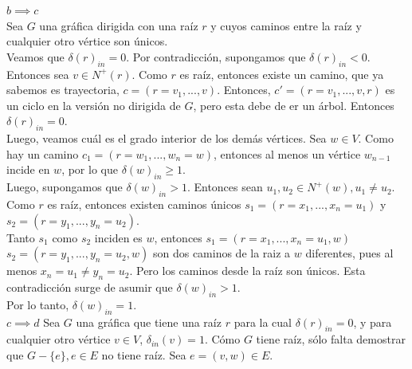 \documentclass[12pt,a4paper]{report}
\begin{document}
\begin{enumerate}
{			$b \implies c$\\
			Sea $G$ una gráfica dirigida con una raíz $r$ y cuyos caminos entre la raíz y
			cualquier otro vértice son únicos.\\
			Veamos que $\delta(r)_{in} = 0$. Por contradicción, supongamos que
			$\delta(r)_{in} < 0$. Entonces sea $v \in N^+(r)$. Como $r$ es raíz,
			entonces existe un camino, que ya sabemos es trayectoria,
			$c = (r = v_1, ..., v)$. Entonces, $c' = (r = v_1, ..., v, r)$ es un
			ciclo en la versión no dirigida de $G$, pero esta debe de er un árbol.
			Entonces $\delta(r)_{in} = 0$.\\
			Luego, veamos cuál es el grado interior de los demás vértices.
			Sea $w \in V$. Como hay un camino $c_1 = (r = w_1, ..., w_n = w)$,
			entonces al menos un vértice $w_{n-1}$ incide en $w$, por lo que
			$\delta(w)_{in} \geq 1$.\\
			Luego, supongamos que $\delta(w)_{in} > 1$. Entonces sean
			 $u_1, u_2 \in N^+(w), u_1 \neq u_2$.\\
			Como $r$ es raíz, entonces existen caminos únicos $s_1 = (r = x_1, ..., x_n = u_1)$
			y $s_2 = (r = y_1, ..., y_n = u_2)$.\\
			Tanto $s_1$ como  $s_2$ inciden es $w$, entonces
			$s_1 = (r = x_1, ..., x_n = u_1, w)$ $s_2 = (r = y_1, ..., y_n = u_2, w)$
			son dos caminos de la raiz a $w$ diferentes, pues al menos $x_n = u_1 \neq y_n = u_2$.
			Pero los caminos desde la raíz son únicos. Esta contradicción surge de
			asumir que $\delta(w)_{in} > 1$.\\
			Por lo tanto, $\delta(w)_{in} = 1$.\\

			$c \implies d$
			Sea $G$ una gráfica que tiene una raíz $r$ para la cual $\delta(r)_{in} = 0$,
			y para cualquier otro vértice  $v \in V$, $\delta_{in}(v) = 1$.
			Cómo $G$ tiene raíz, sólo falta demostrar que $G-\{e\}, e \in E$ no tiene
			raíz.
			Sea $e = (v, w) \in E$. 
		}
	\end{enumerate}
\end{document}
